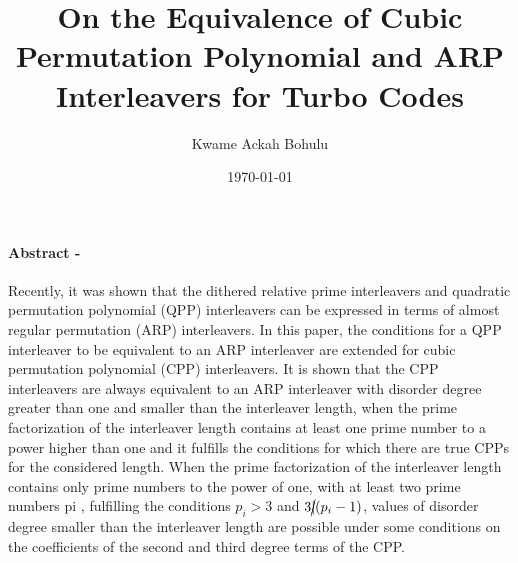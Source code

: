 \documentclass[fontsize=12pt]{article}
\title{On the Equivalence of Cubic Permutation
Polynomial and ARP Interleavers
for Turbo Codes}
\author{Kwame Ackah Bohulu}
\date{\today}
\begin{document}
\maketitle

\newpage
\paragraph{Abstract -}
Recently, it was shown that the dithered relative
prime interleavers and quadratic permutation polynomial (QPP)
interleavers can be expressed in terms of almost regular permutation
(ARP) interleavers. In this paper, the conditions for
a QPP interleaver to be equivalent to an ARP interleaver are
extended for cubic permutation polynomial (CPP) interleavers.
It is shown that the CPP interleavers are always equivalent to
an ARP interleaver with disorder degree greater than one and
smaller than the interleaver length, when the prime factorization
of the interleaver length contains at least one prime number
to a power higher than one and it fulfills the conditions for
which there are true CPPs for the considered length. When
the prime factorization of the interleaver length contains only
prime numbers to the power of one, with at least two prime
numbers pi , fulfilling the conditions $p_i>3$ and $3\cancel{|}(p_i-1)$,
values of disorder degree smaller than the interleaver length are
possible under some conditions on the coefficients of the second
and third degree terms of the CPP.
\end{document}
